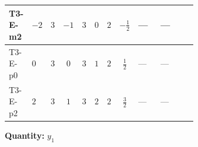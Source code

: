 \documentclass[8pt]{article}
\begin{document}
\begin{landscape}
\begin{longtable}{@{}llcccccc >{\raggedright\arraybackslash}p{0.21\linewidth} >{\raggedright\arraybackslash}p{0.21\linewidth} >{\raggedright\arraybackslash}p{0.21\linewidth}@{}}
\midrule
T3-E-m2 & $-2$ & $3$ & $-1$ & $3$ & $0$ & $2$ & $-\frac{1}{2}$ & --- & --- & \scriptsize\adjustbox{max width=\linewidth}{$\begin{gathered} +\frac{1}{4} (3 \left({y_2}\,\left({y_2}\right)^{\dagger}\,{y_1}\right)_{ij}+2 \left({Y_e}\,\left({Y_e}\right)^{\dagger}\,{y_1}\right)_{ij}+6 \left({y_1}\,\left({y_1}\right)^{\dagger}\,{y_1}\right)_{ij})\end{gathered}$} \\
\midrule
T3-E-p0 & $0$ & $3$ & $0$ & $3$ & $1$ & $2$ & $\frac{1}{2}$ & --- & --- & \scriptsize\adjustbox{max width=\linewidth}{$\begin{gathered} +\frac{1}{4} (3 \left({y_2}\,\left({y_2}\right)^{\dagger}\,{y_1}\right)_{ij}+2 \left({Y_e}\,\left({Y_e}\right)^{\dagger}\,{y_1}\right)_{ij}+6 \left({y_1}\,\left({y_1}\right)^{\dagger}\,{y_1}\right)_{ij})\end{gathered}$} \\
\midrule
T3-E-p2 & $2$ & $3$ & $1$ & $3$ & $2$ & $2$ & $\frac{3}{2}$ & --- & --- & \scriptsize\adjustbox{max width=\linewidth}{$\begin{gathered} +\frac{1}{4} (3 \left({y_2}\,\left({y_2}\right)^{\dagger}\,{y_1}\right)_{ij}+2 \left({Y_e}\,\left({Y_e}\right)^{\dagger}\,{y_1}\right)_{ij}+6 \left({y_1}\,\left({y_1}\right)^{\dagger}\,{y_1}\right)_{ij})\end{gathered}$} \\
\midrule
\bottomrule
\end{longtable}
\clearpage
\noindent\textbf{Quantity: }$y_1$\par\smallskip

\end{landscape}
\end{document}
